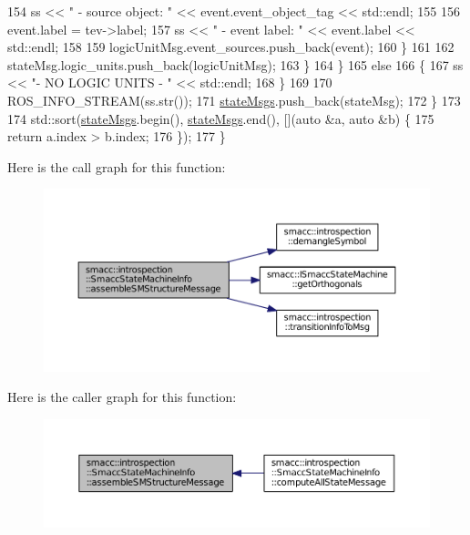 \begin{DoxyCode}
154                     ss << \textcolor{stringliteral}{"                 - source object: "} << \textcolor{keyword}{event}.event\_object\_tag << std::endl;
155 
156                     \textcolor{keyword}{event}.label = tev->label;
157                     ss << \textcolor{stringliteral}{"                 - event label: "} << \textcolor{keyword}{event}.label << std::endl;
158 
159                     logicUnitMsg.event\_sources.push\_back(event);
160                 \}
161 
162                 stateMsg.logic\_units.push\_back(logicUnitMsg);
163             \}
164         \}
165         \textcolor{keywordflow}{else}
166         \{
167             ss << \textcolor{stringliteral}{"- NO LOGIC UNITS - "} << std::endl;
168         \}
169 
170         ROS\_INFO\_STREAM(ss.str());
171         \hyperlink{classsmacc_1_1introspection_1_1SmaccStateMachineInfo_a48e3ff7bbe2673d23e6942234446ebee}{stateMsgs}.push\_back(stateMsg);
172     \}
173 
174     std::sort(\hyperlink{classsmacc_1_1introspection_1_1SmaccStateMachineInfo_a48e3ff7bbe2673d23e6942234446ebee}{stateMsgs}.begin(), \hyperlink{classsmacc_1_1introspection_1_1SmaccStateMachineInfo_a48e3ff7bbe2673d23e6942234446ebee}{stateMsgs}.end(), [](\textcolor{keyword}{auto} &a, \textcolor{keyword}{auto} &b) \{
175         \textcolor{keywordflow}{return} a.index > b.index;
176     \});
177 \}
\end{DoxyCode}


Here is the call graph for this function\+:
\nopagebreak
\begin{figure}[H]
\begin{center}
\leavevmode
\includegraphics[width=350pt]{classsmacc_1_1introspection_1_1SmaccStateMachineInfo_a6758065a8d1faaa7c3688cf0dffe9334_cgraph}
\end{center}
\end{figure}




Here is the caller graph for this function\+:
\nopagebreak
\begin{figure}[H]
\begin{center}
\leavevmode
\includegraphics[width=350pt]{classsmacc_1_1introspection_1_1SmaccStateMachineInfo_a6758065a8d1faaa7c3688cf0dffe9334_icgraph}
\end{center}
\end{figure}


